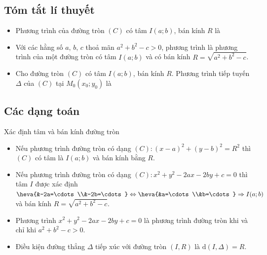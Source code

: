 \subsection{Tóm tắt lí thuyết}
\setcounter{ex}{0}
\setcounter{bt}{0}
\begin{itemize}
	\item Phương trình của đường tròn $(C)$ có tâm $I(a;b)$, bán kính $R$ là
	\item Với các hằng số $a$, $b$, $c$ thoả mãn $a^2+b^2-c>0$, phương trình
	là phương trình của một đường tròn có tâm $I(a;b)$ và có bán kính $R=\sqrt{a^2+b^2-c}$.
	\item Cho đường tròn $(C)$ có tâm $I(a;b)$, bán kính $R$. Phương trình tiếp tuyến $\Delta$ của $(C)$ tại $M_0\left(x_0; y_0\right)$ là 
\end{itemize}
\subsection{Các dạng toán}
\begin{dang}{Xác định tâm và bán kính đường tròn}
	\begin{itemize}
		\item Nếu phương trình đường tròn có dạng $(C)\colon \left(x-a\right)^2+\left(y-b\right)^2=R^2$ thì $(C)$ có tâm là $I(a;b)$ và bán kính bằng $R$.
		\item Nếu phương trình đường tròn có dạng $(C)\colon x^2+y^2-2ax-2by+c=0$ thì tâm $I$ được xác định 
		$\heva{&-2a=\cdots\\&-2b=\cdots} \Leftrightarrow \heva{&a=\cdots\\&b=\cdots }\Rightarrow I(a;b)$ và bán kính $R=\sqrt{a^2+b^2-c}$.
	\end{itemize}
	\begin{note}
		\begin{itemize}
			\item Phương trình $x^2+y^2-2ax-2by+c=0$ là phương trình đường tròn khi và chỉ khi $a^2+b^2-c>0$.
			\item Điều kiện đường thẳng $\Delta$ tiếp xúc với đường tròn $(I,R)$ là $\mathrm{d}\left(I,\Delta\right)=R$.
		\end{itemize}
	\end{note}
\end{dang}
